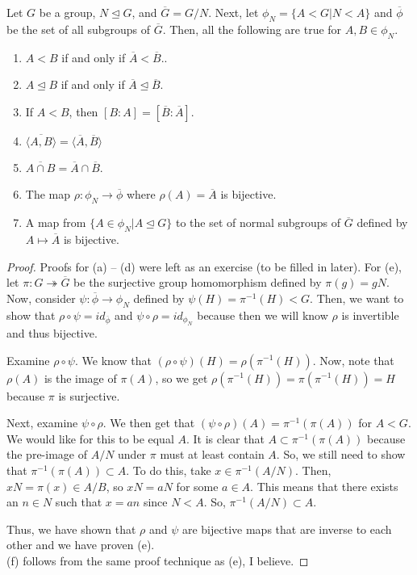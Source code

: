 \documentclass[11pt,leqno,oneside]{amsart}
\newcommand{\subgroup}{\mathrel{<}}
\newcommand{\normsubgroup}{\mathrel{\unlhd}}
\begin{document}
\begin{thm}
    Let $G$ be a group, $N \normsubgroup G$, and $\overline{G} = G/N$. Next, let
    $\phi_N = \{ A \subgroup G | N \subgroup A \}$ and $\overline{\phi}$ be the
    set of all subgroups of $\overline{G}$. Then, all the following are true for $A,B \in \phi_N$.
    \begin{enumerate}[label=(\alph*)]
        \item $A \subgroup B$ if and only if $\overline{A} \subgroup \overline{B}$..
        \item $A \normsubgroup B$ if and only if $\overline{A} \normsubgroup
            \overline{B}$.
        \item If $A \subgroup B$, then $[B:A] = [\overline{B}:\overline{A}]$.
        \item $\overline{\langle A, B \rangle} = \langle \overline{A}, \overline{B} \rangle$
        \item $\overline{A \cap B} = \overline{A} \cap \overline{B}$.
        \item The map $\rho: \phi_N \to \overline{\phi}$ where $\rho(A) =
            \overline{A}$ is bijective.
        \item A map from $\{ A \in \phi_N | A \normsubgroup G\}$ to the set of
            normal subgroups of $\overline{G}$ defined by $A \mapsto
            \overline{A}$ is bijective.
    \end{enumerate}
\end{thm}
\begin{proof}
    Proofs for (a) -- (d) were left as an exercise (to be filled in later).
    For (e), let $\pi: G \twoheadrightarrow \overline{G}$ be the surjective
    group homomorphism defined by $\pi(g) = gN$. Now, consider $\psi:
    \overline{\phi} \to \phi_N$ defined by $\psi(H) = \pi^{-1}(H) \subgroup G$.
    Then, we want to show that $\rho \circ \psi = id_{\overline{\phi}}$ and
    $\psi \circ \rho = id_{\phi_N}$ because then we will know $\rho$ is
    invertible and thus bijective.

    Examine $\rho \circ \psi$. We know that $(\rho \circ \psi)(H) =
    \rho(\pi^{-1}(H))$. Now, note that $\rho(A)$ is the image of $\pi(A)$, so
    we get $\rho(\pi^{-1}(H)) = \pi(\pi^{-1}(H)) = H$ because $\pi$ is
    surjective.

    Next, examine $\psi \circ \rho$. We then get that $(\psi \circ \rho)(A) =
    \pi^{-1}(\pi(A))$ for $A \subgroup G$. We would like for this to be equal
    $A$. It is clear that $A \subset \pi^{-1}(\pi(A))$ because the pre-image of
    $A/N$ under $\pi$ must at least contain $A$. So, we still need to show that
    $\pi^{-1}(\pi(A)) \subset A$. To do this, take $x \in \pi^{-1}(A/N)$. Then,
    $xN = \pi(x) \in A/B$, so $xN = aN$ for some $a \in A$. This means that
    there exists an $n \in N$ such that $x = an$ since $N \subgroup A$. So,
    $\pi^{-1}(A/N) \subset A$.

    Thus, we have shown that $\rho$ and $\psi$ are bijective maps that are
    inverse to each other and we have proven (e). \\

    (f) follows from the same proof technique as (e), I believe.
\end{proof}
\end{document}
